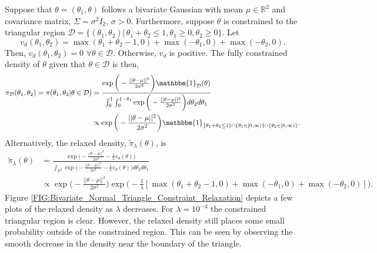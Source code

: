 \documentclass[10pt,fleqn]{article}
\DeclareMathOperator{\1}{\mathbbm{1}}
\begin{document}
{Suppose that $\theta = (\theta_1,\theta)$ follows a bivariate Gaussian with mean $\mu \in\mathbb{R}^2$ and covariance matrix, $\Sigma = \sigma^2 I_2$, $\sigma > 0$. Furthermore, suppose $\theta$ is constrained to the triangular region $\mathcal{D} = \{(\theta_1,\theta_2) | \, \theta_1+\theta_2\le 1, \theta_1\ge0, \theta_2 \ge 0\}.$ Let $$v_d(\theta_1,\theta_2) = \max(\theta_1+\theta_2 -1,0) + \max(-\theta_1,0) + \max(-\theta_2,0).$$
Then, $v_d(\theta_1,\theta_2) = 0$ $\forall \theta\in\mathcal{D}$. Otherwise, $v_d$ is positive.  The fully constrained density of $\theta$ given that $\theta\in \mathcal{D}$ is then,
\begin{align*}
\pi_\mathcal{D}(\theta_1,\theta_2)= \pi(\theta_1,\theta_2|\theta\in\mathcal{D})&= \frac{\exp\bigg(-\frac{||\theta-\mu||^2}{2\sigma^2}\bigg)\mathbbm{1}_\mathcal{D}(\theta)}{\int_0^1\int_0^{1-\theta_1}\exp\bigg(-\frac{||\theta-\mu||^2}{2\sigma^2}\bigg)d\theta_2d\theta_1}\\
&\propto \exp\bigg(-\frac{||\theta-\mu||^2}{2\sigma^2}\bigg) \mathbbm{1}_{\{\theta_1+\theta_2\le 1\}\cap \{\theta_1 \in [0,\infty)\}\cap \{\theta_2\in[0,\infty)\}} .
\end{align*}
Alternatively, the relaxed density, $\tilde{\pi}_\lambda(\theta)$, is
\begin{equation}
\begin{split}
\tilde{\pi}_\lambda(\theta) &=\frac{\exp\bigg(-\frac{||\theta-\mu||^2}{2\sigma^2} - \frac{1}{\lambda}v_d(\theta) \bigg)}{\int_{\mathbb{R}^2} \exp\bigg(-\frac{||\theta-\mu||^2}{2\sigma^2}-\frac{1}{\lambda}v_d(\theta) \bigg)d\theta_2d\theta_1}\\
& \propto \exp\bigg(-\frac{||\theta-\mu||^2}{2\sigma^2}\bigg)\exp\bigg( - \frac{1}{\lambda}[\max(\theta_1+\theta_2 -1,0) + \max(-\theta_1,0) + \max(-\theta_2,0)] \bigg).
\end{split}
\label{EQ:Relaxed_Density_Bivariate_Normal_Triangle}
\end{equation}
Figure \ref{FIG:Bivariate_Normal_Triangle_Constraint_Relaxation} depicts a few plots of the relaxed density as $\lambda$ decreases.  For $\lambda=10^{-4}$ the constrained triangular region is clear. However, the relaxed density still places some small probability outside of the constrained region. This can be seen by observing the smooth decrease in the density near the boundary of the triangle.

}
\end{document}
